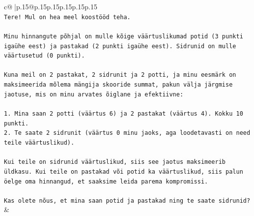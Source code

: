 \documentclass{article}
\begin{document}
{\begin{supertabular}{c@{$\;$}|p{.15\linewidth}@{}p{.15\linewidth}p{.15\linewidth}p{.15\linewidth}p{.15\linewidth}p{.15\linewidth}}
{{{\\ 
\texttt{Tere! Mul on hea meel koostööd teha.} \\
\\ 
\texttt{Minu hinnangute põhjal on mulle kõige väärtuslikumad potid (3 punkti igaühe eest) ja pastakad (2 punkti igaühe eest). Sidrunid on mulle väärtusetud (0 punkti).} \\
\\ 
\texttt{Kuna meil on 2 pastakat, 2 sidrunit ja 2 potti, ja minu eesmärk on maksimeerida mõlema mängija skooride summat, pakun välja järgmise jaotuse, mis on minu arvates õiglane ja efektiivne:} \\
\\ 
\texttt{1. Mina saan 2 potti (väärtus 6) ja 2 pastakat (väärtus 4). Kokku 10 punkti.} \\
\texttt{2. Te saate 2 sidrunit (väärtus 0 minu jaoks, aga loodetavasti on need teile väärtuslikud).} \\
\\ 
\texttt{Kui teile on sidrunid väärtuslikud, siis see jaotus maksimeerib üldkasu. Kui teile on pastakad või potid ka väärtuslikud, siis palun öelge oma hinnangud, et saaksime leida parema kompromissi.} \\
\\ 
\texttt{Kas olete nõus, et mina saan potid ja pastakad ning te saate sidrunid?} \\
            }
        }
    }
    & \\ \\


\end{supertabular}}
\end{document}
